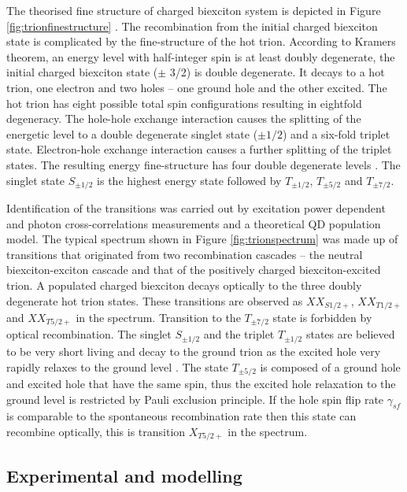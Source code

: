 \documentclass[12pt, twoside]{article}
\numberwithin{equation}{section}
\begin{document}

The theorised fine structure of charged biexciton system is depicted in
Figure \ref{fig:trionfinestructure} \cite{ht1, ht2, ht3}. The
recombination from the initial charged biexciton state is complicated by
the fine-structure of the hot trion. According to Kramers theorem, an
energy level with half-integer spin is at least doubly degenerate, the
initial charged biexciton state ($\pm$ 3/2) is double degenerate. It
decays to a hot trion, one electron and two holes -- one ground hole and
the other excited. The hot trion has eight possible total spin
configurations resulting in eightfold degeneracy. The hole-hole exchange
interaction causes the splitting of the energetic level to a double
degenerate singlet state ($\pm 1/2$) and a six-fold triplet state.
Electron-hole exchange interaction causes a further splitting of the
triplet states. The resulting energy fine-structure has four double
degenerate levels \cite{ht2}. The singlet state $S_{\pm 1/2}$ is the
highest energy state followed by $T_{\pm 1/2}$, $T_{\pm 5/2}$ and
$T_{\pm 7/2}$.

Identification of the transitions was carried out by excitation power
dependent and photon cross-correlations measurements and a theoretical
QD population model. The typical spectrum shown in Figure
\ref{fig:trionspectrum} was made up of transitions that originated from
two recombination cascades -- the neutral biexciton-exciton cascade and
that of the positively charged biexciton-excited trion. A populated
charged biexciton decays optically to the three doubly degenerate hot
trion states. These transitions are observed as $XX_{S1/2+}$,
$XX_{T1/2+}$ and $XX_{T5/2+}$ in the spectrum. Transition to the
$T_{\pm7/2}$ state is forbidden by optical recombination. The singlet
$S_{\pm1/2}$ and the triplet $T_{\pm1/2}$ states are believed to be very
short living and decay to the ground trion as the excited hole very
rapidly relaxes to the ground level \cite{ht2, ht3}. The state
$T_{\pm5/2}$ is composed of a ground hole and excited hole that have the
same spin, thus the excited hole relaxation to the ground level is
restricted by Pauli exclusion principle. If the hole spin flip rate
$\gamma_{sf}$ is comparable to the spontaneous recombination rate then
this state can recombine optically, this is transition $X_{T5/2+}$ in
the spectrum.

\subsection{Experimental and
modelling}\label{experimental-and-modelling}
\end{document}
